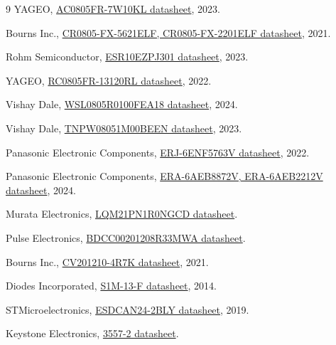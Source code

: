 \documentclass[10pt]{datasheet}
\begin{document}
\begin{thebibliography}{9}
YAGEO, \href{https://www.yageo.com/upload/media/product/productsearch/datasheet/rchip/PYu-AC_51_RoHS_L_10.pdf}{AC0805FR-7W10KL datasheet}, 2023.

Bourns Inc., \href{https://www.bourns.com/docs/product-datasheets/cr.pdf?sfvrsn=574d41f6_14}{CR0805-FX-5621ELF, CR0805-FX-2201ELF datasheet}, 2021.

Rohm Semiconductor, \href{https://fscdn.rohm.com/en/products/databook/datasheet/passive/resistor/chip_resistor/esr-e.pdf}{ESR10EZPJ301 datasheet}, 2023.

YAGEO, \href{https://www.yageo.com/upload/media/product/products/datasheet/rchip/PYu-RC_Group_51_RoHS_L_12.pdf}{RC0805FR-13120RL datasheet}, 2022.

Vishay Dale, \href{https://www.vishay.com/docs/31057/wslhigh.pdf}{WSL0805R0100FEA18 datasheet}, 2024.

Vishay Dale, \href{https://www.vishay.com/docs/28758/tnpw_e3.pdf}{TNPW08051M00BEEN datasheet}, 2023.

Panasonic Electronic Components, \href{https://industrial.panasonic.com/cdbs/www-data/pdf/RDA0000/AOA0000C304.pdf}{ERJ-6ENF5763V datasheet}, 2022.

Panasonic Electronic Components, \href{https://industrial.panasonic.com/cdbs/www-data/pdf/RDM0000/AOA0000C307.pdf}{ERA-6AEB8872V, ERA-6AEB2212V datasheet}, 2024.

Murata Electronics, \href{https://search.murata.co.jp/Ceramy/image/img/P02/JELF243B-0028.pdf}{LQM21PN1R0NGCD datasheet}.

Pulse Electronics, \href{https://productfinder.pulseelectronics.com/api/open/part-attachments/datasheet/BDCC00201208R33MWA}{BDCC00201208R33MWA datasheet}.

Bourns Inc., \href{https://www.bourns.com/docs/Product-Datasheets/CV201210.pdf}{CV201210-4R7K datasheet}, 2021.

Diodes Incorporated, \href{https://www.diodes.com/assets/Datasheets/ds16003.pdf}{S1M-13-F datasheet}, 2014.

STMicroelectronics, \href{https://eu.mouser.com/datasheet/2/389/esdcan01_2bly-1551146.pdf}{ESDCAN24-2BLY datasheet}, 2019.

Keystone Electronics, \href{https://www.keyelco.com/userAssets/file/M65p41.pdf}{3557-2 datasheet}.


\end{thebibliography}
\end{document}
